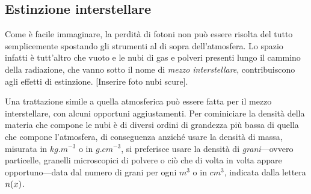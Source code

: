    \subsection{Estinzione interstellare}
        Come è facile immaginare, la perdità di fotoni non può essere risolta del tutto semplicemente spostando gli strumenti al di sopra dell'atmosfera. Lo spazio infatti è tutt'altro che vuoto e le nubi di gas e polveri presenti lungo il cammino della radiazione, che vanno sotto il nome di \emph{mezzo interstellare}, contribuiscono agli effetti di estinzione. [Inserire foto nubi scure].

        Una trattazione simile a quella atmosferica può essere fatta per il mezzo interstellare, con alcuni opportuni aggiustamenti. Per cominiciare la densità della materia che compone le nubi è di diversi ordini di grandezza più bassa di quella che compone l'atmosfera, di conseguenza anziché usare la densità di massa, misurata in $\unit{kg.m^{-3}}$ o in $\unit{g.cm^{-3}}$, si preferisce usare la densità di \emph{grani}---ovvero particelle, granelli microscopici di polvere o ciò che di volta in volta appare opportuno---data dal numero di grani per ogni $\unit{m^3}$ o in $\unit{cm^3}$, indicata dalla lettera $n\pqty{x}$.
        

